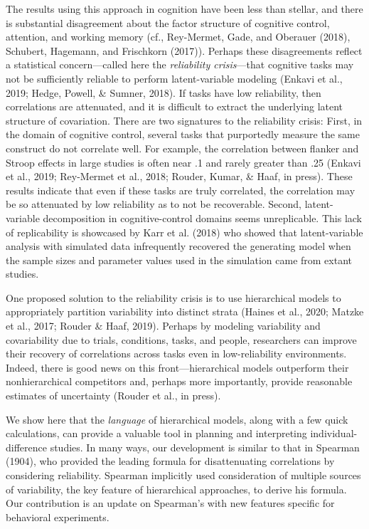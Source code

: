 \documentclass[
  ,man]{apa6}
\begin{document}
The results using this approach in cognition have been less than stellar, and there is substantial disagreement about the factor structure of cognitive control, attention, and working memory (cf., Rey-Mermet, Gade, and Oberauer (2018), Schubert, Hagemann, and Frischkorn (2017)). Perhaps these disagreements reflect a statistical concern---called here the \emph{reliability crisis}---that cognitive tasks may not be sufficiently reliable to perform latent-variable modeling (Enkavi et al., 2019; Hedge, Powell, \& Sumner, 2018). If tasks have low reliability, then correlations are attenuated, and it is difficult to extract the underlying latent structure of covariation. There are two signatures to the reliability crisis: First, in the domain of cognitive control, several tasks that purportedly measure the same construct do not correlate well. For example, the correlation between flanker and Stroop effects in large studies is often near .1 and rarely greater than .25 (Enkavi et al., 2019; Rey-Mermet et al., 2018; Rouder, Kumar, \& Haaf, in press). These results indicate that even if these tasks are truly correlated, the correlation may be so attenuated by low reliability as to not be recoverable. Second, latent-variable decomposition in cognitive-control domains seems unreplicable. This lack of replicability is showcased by Karr et al. (2018) who showed that latent-variable analysis with simulated data infrequently recovered the generating model when the sample sizes and parameter values used in the simulation came from extant studies.

One proposed solution to the reliability crisis is to use hierarchical models to appropriately partition variability into distinct strata (Haines et al., 2020; Matzke et al., 2017; Rouder \& Haaf, 2019). Perhaps by modeling variability and covariability due to trials, conditions, tasks, and people, researchers can improve their recovery of correlations across tasks even in low-reliability environments. Indeed, there is good news on this front---hierarchical models outperform their nonhierarchical competitors and, perhaps more importantly, provide reasonable estimates of uncertainty (Rouder et al., in press).

We show here that the \emph{language} of hierarchical models, along with a few quick calculations, can provide a valuable tool in planning and interpreting individual-difference studies. In many ways, our development is similar to that in Spearman (1904), who provided the leading formula for disattenuating correlations by considering reliability. Spearman implicitly used consideration of multiple sources of variability, the key feature of hierarchical approaches, to derive his formula. Our contribution is an update on Spearman's with new features specific for behavioral experiments.
\end{document}
